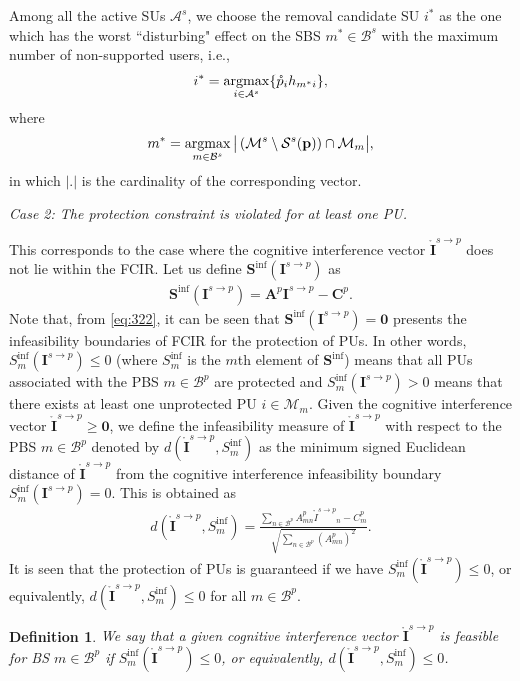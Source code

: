 \documentclass[journal,twoside]{IEEEtran}
\newcommand{\A}{\mathcal{A}}
\newcommand{\B}{\mathcal{B}}
\newcommand{\s}{\mathcal{S}}
\newcommand{\M}{\mathcal{M}}
\newcommand{\argmax}{\operatornamewithlimits{argmax}}
\newcommand{\pbold}{\mathbf{p}}
\newcommand{\pzero}{\mathring{p}}
\newcommand{\CIbold}{\mathbf{I}^{s \rightarrow p}}
\newcommand{\CIzero}{{\mathring{I}^{s \rightarrow p}}}
\newcommand{\CIzerobold}{{\mathring{\mathbf{I}}^{s \rightarrow p}}}
\newtheorem {definition}{Definition}
\begin{document}
Among all the active SUs $\A^s$, we choose the removal candidate SU $i^{*}$ as the one which has the worst ``disturbing" effect on the SBS $m^{*}\in\B^s$ with the maximum number of non-supported users, i.e.,
	\begin{align}
	\label{eq:23}
		i^{*}=\argmax_{i\in\A^s} \{ \pzero_i h_{m^{*}i} \},
	\end{align}
	where 
	\begin{align}
	\label{eq:24}
		m^{*}=\argmax_{m\in\B^s} \big| \left( \M^s \setminus \s^s(\pbold)\right)
		 \cap \M_m \big|,
	\end{align}
	in which $|.|$ is the cardinality of the corresponding vector.
	
	\textit{Case 2: The protection constraint is violated for at least one PU.}
	
	This corresponds to the case where the cognitive interference vector $\CIzerobold$ does not lie within the FCIR. Let us define $\mathbf{S}^{\mathrm{inf}}(\CIbold)$ as
	\begin{align}
	\label{eq:sm}
		\mathbf{S}^{\mathrm{inf}}(\CIbold)=
		\mathbf{A}^{\!p}  \mathbf{I}^{s\rightarrow p} - \mathbf{C}^p.
	\end{align}
	Note that, from \eqref{eq:322}, it can be seen that $\mathbf{S}^{\mathrm{inf}}(\CIbold)=\mathbf{0}$ presents the infeasibility boundaries of FCIR for the protection of PUs. In other words, $S_m^{\mathrm{inf}}(\CIbold)\leq 0$ (where $S_m^{\mathrm{inf}}$ is the $m$th element of $\mathbf{S}^{\mathrm{inf}}$) means that all PUs associated with the PBS $m\in\B^p$ are protected and $S_m^{\mathrm{inf}}(\CIbold) > 0$ means that there exists at least one unprotected PU $i\in\M_m$.
	Given the cognitive interference vector $\CIzerobold\geq \mathbf{0}$, we define the infeasibility measure of $\CIzerobold$ with respect to the PBS $m\in\B^p$ denoted by $d(\CIzerobold,S_m^{\mathrm{inf}})$ as the minimum signed Euclidean distance of $\CIzerobold$ from the cognitive interference infeasibility boundary $S_m^{\mathrm{inf}}(\CIbold)=0$. This is obtained as
	\begin{align}
	\label{eq:d}
		d(\CIzerobold,S_m^{\mathrm{inf}})= 
		\frac{\sum_{n\in\B^p} A_{mn}^p \CIzero_n - C_m^{p}}{\sqrt{\sum_{n\in\B^p} \left(A_{mn}^p\right)^2}}.
	\end{align}
It is seen that the protection of PUs is guaranteed if  we have $S_m^{\mathrm{inf}}(\CIzerobold) \leq 0$, or equivalently, $d(\CIzerobold,S_m^{\mathrm{inf}})\leq 0$ for all $m\in\B^p$. 
	\begin{definition}
		We say that a given cognitive interference vector $\mathring{\mathbf{I}}^{s \rightarrow p}$ is feasible for BS $m\in\B^p$ if $S_m^{\mathrm{inf}}(\CIzerobold) \leq 0$, or equivalently, $d(\CIzerobold,S_m^{\mathrm{inf}})\leq 0$.
	\label{def:23}
	\end{definition}
	
\end{document}
